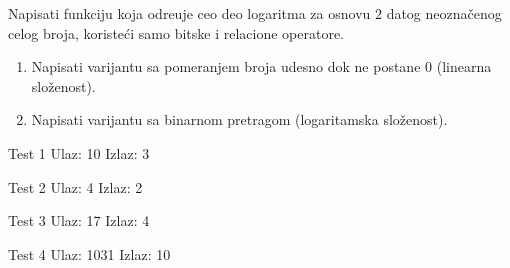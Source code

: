 \begin{Exercise}[label=405]
  Napisati funkciju koja odre\dj uje ceo deo logaritma za osnovu $2$
  datog neozna\v cenog celog broja, koriste\' ci samo bitske i
  relacione operatore.
  \begin{enumerate}
  \item Napisati varijantu sa pomeranjem broja udesno dok ne postane 0
    (linearna slo\v zenost).
  \item Napisati varijantu sa binarnom pretragom (logaritamska slo\v
    zenost).
  \end{enumerate}
  
  \begin{minitest}
    \begin{test}{Test 1}
      Ulaz:       10
      Izlaz:      3
    \end{test}
  \end{minitest}
  \begin{minitest}
    \begin{test}{Test 2}
      Ulaz:       4
      Izlaz:      2
    \end{test}
  \end{minitest}
  \begin{minitest}
    \begin{test}{Test 3}
      Ulaz:       17
      Izlaz:      4
    \end{test}
  \end{minitest}
  
  \begin{miditest}
    \begin{test}{Test 4}
      Ulaz:       1031
      Izlaz:      10
    \end{test}
  \end{miditest}
  
\end{Exercise}

